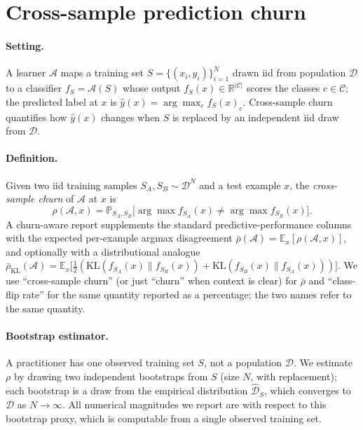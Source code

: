 \section{Cross-sample prediction churn}
\label{sec:measurement}

\paragraph{Setting.}
A learner $\mathcal{A}$ maps a training set
$S = \{(x_i, y_i)\}_{i=1}^{N}$ drawn iid from population $\mathcal{D}$
to a classifier $f_S = \mathcal{A}(S)$ whose output $f_S(x) \in
\mathbb{R}^{|\mathcal{C}|}$ scores the classes $c \in \mathcal{C}$;
the predicted label at $x$ is
$\hat{y}(x) = \arg\max_{c} f_S(x)_c$.
Cross-sample churn quantifies how $\hat{y}(x)$ changes when $S$ is
replaced by an independent iid draw from $\mathcal{D}$.

\paragraph{Definition.}
Given two iid training samples $S_A, S_B \sim \mathcal{D}^N$ and a
test example $x$, the \emph{cross-sample churn} of $\mathcal{A}$ at
$x$ is
\begin{equation}
  \rho(\mathcal{A}, x) =
  \mathbb{P}_{S_A, S_B}\!\big[\arg\max f_{S_A}(x) \neq \arg\max f_{S_B}(x)\big].
\end{equation}
A churn-aware report supplements the standard predictive-performance
columns with the expected per-example argmax disagreement
$\bar\rho(\mathcal{A}) = \mathbb{E}_x [\rho(\mathcal{A}, x)]$, and
optionally with a distributional analogue
$\bar\rho_{\mathrm{KL}}(\mathcal{A})
= \mathbb{E}_x \big[\tfrac{1}{2}(\mathrm{KL}(f_{S_A}(x) \| f_{S_B}(x))
                                + \mathrm{KL}(f_{S_B}(x) \| f_{S_A}(x)))\big]$.
We use ``cross-sample churn'' (or just ``churn'' when context is
clear) for $\bar\rho$ and ``class-flip rate'' for the same quantity
reported as a percentage; the two names refer to the same quantity.

\paragraph{Bootstrap estimator.}
A practitioner has one observed training set $S$, not a population
$\mathcal{D}$.  We estimate $\rho$ by drawing two independent
bootstraps from $S$ (size $N$, with replacement); each bootstrap is
a draw from the empirical distribution $\hat{\mathcal{D}}_S$, which
converges to $\mathcal{D}$ as $N \to \infty$.  All
numerical magnitudes we report are with respect to this bootstrap
proxy, which is computable from a single observed training
set.

